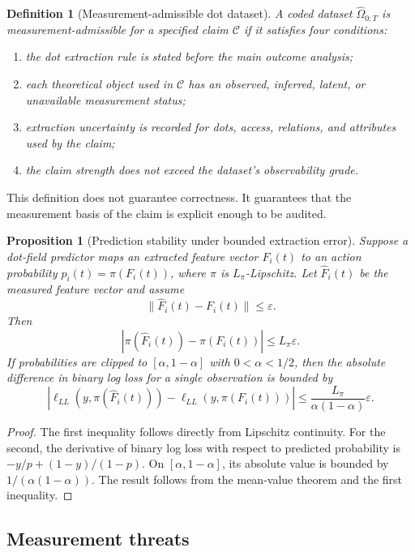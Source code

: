 \documentclass[11pt]{article}
\newtheorem{definition}{Definition}
\newtheorem{proposition}{Proposition}
\theoremstyle{remark}
\begin{document}
\begin{definition}[Measurement-admissible dot dataset]
A coded dataset \(\widehat\Omega_{0:T}\) is measurement-admissible for a
specified claim \(\mathcal C\) if it satisfies four conditions:
\begin{enumerate}[leftmargin=*]
\item the dot extraction rule is stated before the main outcome analysis;
\item each theoretical object used in \(\mathcal C\) has an observed,
inferred, latent, or unavailable measurement status;
\item extraction uncertainty is recorded for dots, access, relations, and
attributes used by the claim;
\item the claim strength does not exceed the dataset's observability grade.
\end{enumerate}
\end{definition}

This definition does not guarantee correctness. It guarantees that the
measurement basis of the claim is explicit enough to be audited.

\begin{proposition}[Prediction stability under bounded extraction error]
Suppose a dot-field predictor maps an extracted feature vector
\(F_i(t)\) to an action probability \(p_i(t)=\pi(F_i(t))\), where
\(\pi\) is \(L_\pi\)-Lipschitz. Let \(\widehat F_i(t)\) be the measured
feature vector and assume
\[
\|\widehat F_i(t)-F_i(t)\|\leq \varepsilon.
\]
Then
\[
|\pi(\widehat F_i(t))-\pi(F_i(t))|\leq L_\pi\varepsilon.
\]
If probabilities are clipped to \([\alpha,1-\alpha]\) with
\(0<\alpha<1/2\), then the absolute difference in binary log loss for a
single observation is bounded by
\[
|\ell_{LL}(y,\pi(\widehat F_i(t)))-\ell_{LL}(y,\pi(F_i(t)))|
\leq \frac{L_\pi}{\alpha(1-\alpha)}\varepsilon.
\]
\end{proposition}

\begin{proof}
The first inequality follows directly from Lipschitz continuity. For the
second, the derivative of binary log loss with respect to predicted
probability is \(-y/p+(1-y)/(1-p)\). On \([\alpha,1-\alpha]\), its
absolute value is bounded by \(1/(\alpha(1-\alpha))\). The result follows
from the mean-value theorem and the first inequality.
\end{proof}

\subsection{Measurement threats}\label{measurement-threats}
\end{document}
